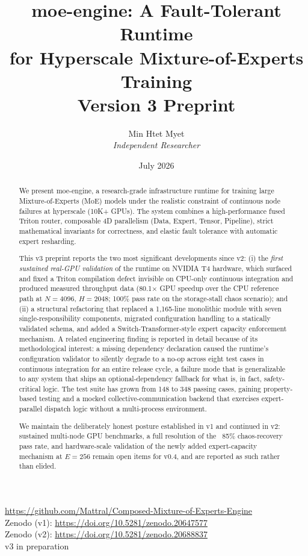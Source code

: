 \documentclass[11pt]{article}
\title{\textbf{moe-engine: A Fault-Tolerant Runtime\\for Hyperscale Mixture-of-Experts Training}\\
\large Version 3 Preprint}
\author{Min Htet Myet \\ \textit{Independent Researcher}}
\date{July 2026}
\begin{document}
\maketitle

\begin{center}
\url{https://github.com/Mattral/Composed-Mixture-of-Experts-Engine} \\
Zenodo (v1): \url{https://doi.org/10.5281/zenodo.20647577} \\
Zenodo (v2): \url{https://doi.org/10.5281/zenodo.20688837} \\
v3 in preparation
\end{center}

\begin{abstract}
\noindent
We present moe-engine, a research-grade infrastructure runtime for training
large Mixture-of-Experts (MoE) models under the realistic constraint of
continuous node failures at hyperscale (10K+ GPUs). The system combines a
high-performance fused Triton router, composable 4D parallelism (Data,
Expert, Tensor, Pipeline), strict mathematical invariants for correctness,
and elastic fault tolerance with automatic expert resharding.

This v3 preprint reports the two most significant developments since v2: (i)
the \emph{first sustained real-GPU validation} of the runtime on NVIDIA T4
hardware, which surfaced and fixed a Triton compilation defect invisible on
CPU-only continuous integration and produced measured throughput data
(80.1$\times$ GPU speedup over the CPU reference path at $N{=}4096$,
$H{=}2048$; 100\% pass rate on the storage-stall chaos scenario); and (ii) a
structural refactoring that replaced a 1{,}165-line monolithic module with
seven single-responsibility components, migrated configuration handling to a
statically validated schema, and added a Switch-Transformer-style expert
capacity enforcement mechanism. A related engineering finding is reported in
detail because of its methodological interest: a missing dependency
declaration caused the runtime's configuration validator to silently
degrade to a no-op across eight test cases in continuous integration for an
entire release cycle, a failure mode that is generalizable to any system
that ships an optional-dependency fallback for what is, in fact, safety-critical
logic. The test suite has grown from 148 to 348 passing cases, gaining
property-based testing and a mocked collective-communication backend that
exercises expert-parallel dispatch logic without a multi-process
environment.

We maintain the deliberately honest posture established in v1 and continued
in v2: sustained multi-node GPU benchmarks, a full resolution of the ~85\%
chaos-recovery pass rate, and hardware-scale validation of the newly added
expert-capacity mechanism at $E{=}256$ remain open items for v0.4, and are
reported as such rather than elided.
\end{abstract}
\end{document}
